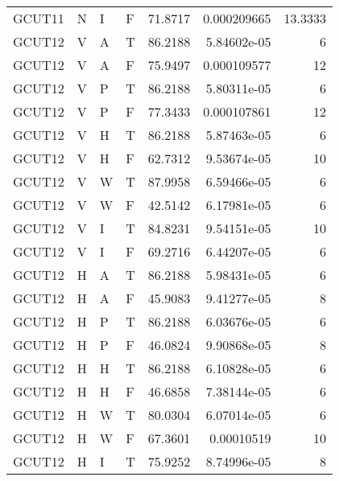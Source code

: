 \begin{longtable}{llllrrr}
    GCUT11   & N         & I         & F          & 71.8717    & 0.000209665 & 13.3333  \\
    GCUT12   & V         & A         & T          & 86.2188    & 5.84602e-05 & 6        \\
    GCUT12   & V         & A         & F          & 75.9497    & 0.000109577 & 12       \\
    GCUT12   & V         & P         & T          & 86.2188    & 5.80311e-05 & 6        \\
    GCUT12   & V         & P         & F          & 77.3433    & 0.000107861 & 12       \\
    GCUT12   & V         & H         & T          & 86.2188    & 5.87463e-05 & 6        \\
    GCUT12   & V         & H         & F          & 62.7312    & 9.53674e-05 & 10       \\
    GCUT12   & V         & W         & T          & 87.9958    & 6.59466e-05 & 6        \\
    GCUT12   & V         & W         & F          & 42.5142    & 6.17981e-05 & 6        \\
    GCUT12   & V         & I         & T          & 84.8231    & 9.54151e-05 & 10       \\
    GCUT12   & V         & I         & F          & 69.2716    & 6.44207e-05 & 6        \\
    GCUT12   & H         & A         & T          & 86.2188    & 5.98431e-05 & 6        \\
    GCUT12   & H         & A         & F          & 45.9083    & 9.41277e-05 & 8        \\
    GCUT12   & H         & P         & T          & 86.2188    & 6.03676e-05 & 6        \\
    GCUT12   & H         & P         & F          & 46.0824    & 9.90868e-05 & 8        \\
    GCUT12   & H         & H         & T          & 86.2188    & 6.10828e-05 & 6        \\
    GCUT12   & H         & H         & F          & 46.6858    & 7.38144e-05 & 6        \\
    GCUT12   & H         & W         & T          & 80.0304    & 6.07014e-05 & 6        \\
    GCUT12   & H         & W         & F          & 67.3601    & 0.00010519  & 10       \\
    GCUT12   & H         & I         & T          & 75.9252    & 8.74996e-05 & 8        \\

\end{longtable}
